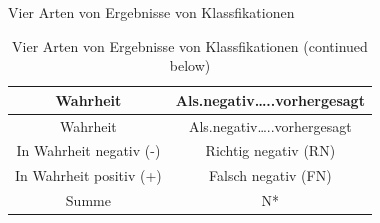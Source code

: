 \begin{frame}{Vier Arten von Ergebnisse von Klassfikationen}

\begin{longtable}[]{@{}cc@{}}
\caption{Vier Arten von Ergebnisse von Klassfikationen (continued
below)}\tabularnewline
\toprule
\begin{minipage}[b]{0.34\columnwidth}\centering\strut
Wahrheit\strut
\end{minipage} & \begin{minipage}[b]{0.39\columnwidth}\centering\strut
Als.negativ\ldots{}..vorhergesagt\strut
\end{minipage}\tabularnewline
\midrule
\endfirsthead
\toprule
\begin{minipage}[b]{0.34\columnwidth}\centering\strut
Wahrheit\strut
\end{minipage} & \begin{minipage}[b]{0.39\columnwidth}\centering\strut
Als.negativ\ldots{}..vorhergesagt\strut
\end{minipage}\tabularnewline
\midrule
\endhead
\begin{minipage}[t]{0.34\columnwidth}\centering\strut
In Wahrheit negativ (-)\strut
\end{minipage} & \begin{minipage}[t]{0.39\columnwidth}\centering\strut
Richtig negativ (RN)\strut
\end{minipage}\tabularnewline
\begin{minipage}[t]{0.34\columnwidth}\centering\strut
In Wahrheit positiv (+)\strut
\end{minipage} & \begin{minipage}[t]{0.39\columnwidth}\centering\strut
Falsch negativ (FN)\strut
\end{minipage}\tabularnewline
\begin{minipage}[t]{0.34\columnwidth}\centering\strut
Summe\strut
\end{minipage} & \begin{minipage}[t]{0.39\columnwidth}\centering\strut
N*\strut
\end{minipage}\tabularnewline
\bottomrule
\end{longtable}


\end{frame}
